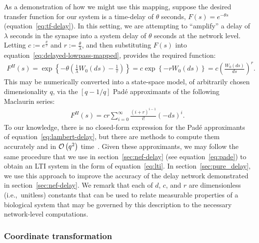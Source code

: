 As a demonstration of how we might use this mapping, suppose the desired transfer function for our system is a time-delay of $\theta$ seconds, $F(s) = e^{-\theta s}$ (equation~\ref{eq:tf-delay}).
In this setting, we are attempting to ``amplify'' a delay of $\lambda$ seconds in the synapse into a system delay of $\theta$ seconds at the network level.
Letting $c := e^{\frac{\theta}{\tau}}$ and $r := \frac{\theta}{\lambda}$, and then substituting $F(s)$ into equation~\ref{eq:delayed-lowpass-mapped}, provides the required function:
\begin{align}
F^H(s) = \exp \left\{ -\theta \left( \frac{1}{\lambda} W_0(ds) - \frac{1}{\tau} \right) \right\} = c \exp \left\{-r W_0(ds) \right\} = c \left( \frac{W_0(ds)}{ds} \right)^r \text{.} \nonumber
\end{align}
This may be numerically converted into a state-space model, of arbitrarily chosen dimensionality $q$, via the $\left[q-1/q\right]$ Pad\'e approximants of the following Maclaurin series:
\begin{align} \label{eq:lambert-delay}
F^H(s) = c r \sum_{i=0}^\infty \frac{(i+r)^{i-1}}{i!} (-ds)^i \text{.}
\end{align}
To our knowledge, there is no closed-form expression for the Pad\'e approximants of equation~\ref{eq:lambert-delay}, but there are methods to compute them accurately and in $\mathcal{O}\left({q^2}\right)$ time~\citep{sidi2003practical}.
Given these approximants, we may follow the same procedure that we use in section~\ref{sec:nef-delay} (see equation~\ref{eq:pade}) to obtain an LTI system in the form of equation~\ref{eq:lti}.
In section~\ref{sec:pure_delay}, we use this approach to improve the accuracy of the delay network demonstrated in section~\ref{sec:nef-delay}. %
We remark that each of $d$, $c$, and $r$ are dimensionless (i.e.,~unitless) constants that can be used to relate measurable properties of a biological system that may be governed by this description to the necessary network-level computations.

\subsubsection{Coordinate transformation}

